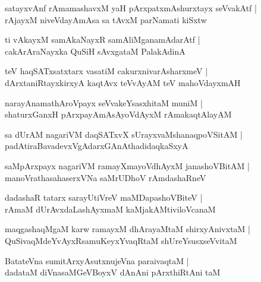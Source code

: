 \documentclass[twoside,12pt,openright]{book}
\newcounter{shloka}[chapter]
\begin{document}
\begin{shloka}%
satayxvAnf rAmamashavxM yaH pArxpatxmAshurxtayx seVvakAtf |\\
rAjayxM niveVdayAmAsa sa tAvxM parNamati kiSxtw
\end{shloka}

\begin{shloka}%
ti vAkayxM samAkaNayxR samAliMganamAdarAtf |\\
cakArAraNayxka QuSiH sAvxgataM PalakAdinA 
\end{shloka}

\begin{shloka}%
teV haqSATxsatxtarx vasatiM cakurxnivarAsharxmeV |\\
dArxtaniRtayxkirxyA kaqtAvx teVvAyAM teV mahoVdayxmAH 
\end{shloka}

\begin{shloka}%
narayAnamathAroVpayx seVvakeYsasxhitaM muniM |\\
shaturxGanxH pArxpayAmAsAyoVdAyxM rAmakaqtAlayAM 
\end{shloka}

\begin{shloka}%
sa dUrAM nagariVM daqSATxvX sUrayxvaMshanaqpoVSitAM |\\
padAtiraBavadevxVgAdarxGAnAthadidaqkaSxyA
\end{shloka}

\begin{shloka}%
saMpArxpayx nagariVM ramayXmayoVdhAyxM janashoVBitAM |\\
manoVrathasahaserxVNa saMrUDhoV rAmdashaRneV 
\end{shloka}

\begin{shloka}%
dadashaR tatarx sarayUtiVreV maMDapashoVBiteV |\\
rAmaM dUrAvxdaLashAyxmaM kaMjakAMtiviloVcanaM 
\end{shloka}

\begin{shloka}%
maqgashaqMgaM karw ramayxM dhArayaMtaM shirxyAnivxtaM |\\
QuSivaqMdeYvAyxRsamuKeyxYvaqRtaM shUreYsusxseVvitaM 
\end{shloka}

\begin{shloka}%
BatateVna sumitArxyAsutxnujeVna paraivaqtaM |\\
dadataM diVnasaMGeVBoyxV dAnAni pArxthiRtAni taM 
\end{shloka}
\end{document}
